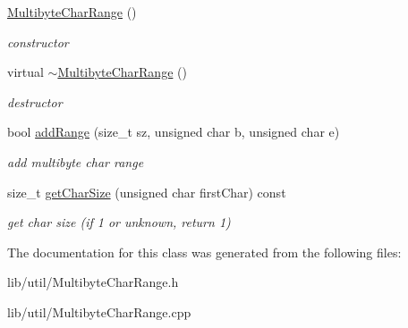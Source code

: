 \begin{DoxyCompactItemize}
\item 
\hypertarget{classsinsy_1_1MultibyteCharRange_aaa536cda9e696aaae746882e47a6d65f}{\hyperlink{classsinsy_1_1MultibyteCharRange_aaa536cda9e696aaae746882e47a6d65f}{\-Multibyte\-Char\-Range} ()}\label{classsinsy_1_1MultibyteCharRange_aaa536cda9e696aaae746882e47a6d65f}

\begin{DoxyCompactList}\small\item\em constructor \end{DoxyCompactList}\item 
\hypertarget{classsinsy_1_1MultibyteCharRange_afadbe4d94ef7850aafe89bbe581c444c}{virtual \hyperlink{classsinsy_1_1MultibyteCharRange_afadbe4d94ef7850aafe89bbe581c444c}{$\sim$\-Multibyte\-Char\-Range} ()}\label{classsinsy_1_1MultibyteCharRange_afadbe4d94ef7850aafe89bbe581c444c}

\begin{DoxyCompactList}\small\item\em destructor \end{DoxyCompactList}\item 
\hypertarget{classsinsy_1_1MultibyteCharRange_a3b3ab6ffb4c23adfc7ca38a0cf65d089}{bool \hyperlink{classsinsy_1_1MultibyteCharRange_a3b3ab6ffb4c23adfc7ca38a0cf65d089}{add\-Range} (size\-\_\-t sz, unsigned char b, unsigned char e)}\label{classsinsy_1_1MultibyteCharRange_a3b3ab6ffb4c23adfc7ca38a0cf65d089}

\begin{DoxyCompactList}\small\item\em add multibyte char range \end{DoxyCompactList}\item 
\hypertarget{classsinsy_1_1MultibyteCharRange_a8573802bf58c8d55f98a02f76bb58a4c}{size\-\_\-t \hyperlink{classsinsy_1_1MultibyteCharRange_a8573802bf58c8d55f98a02f76bb58a4c}{get\-Char\-Size} (unsigned char first\-Char) const }\label{classsinsy_1_1MultibyteCharRange_a8573802bf58c8d55f98a02f76bb58a4c}

\begin{DoxyCompactList}\small\item\em get char size (if 1 or unknown, return 1) \end{DoxyCompactList}\end{DoxyCompactItemize}


\-The documentation for this class was generated from the following files\-:\begin{DoxyCompactItemize}
\item 
lib/util/\-Multibyte\-Char\-Range.\-h\item 
lib/util/\-Multibyte\-Char\-Range.\-cpp\end{DoxyCompactItemize}
